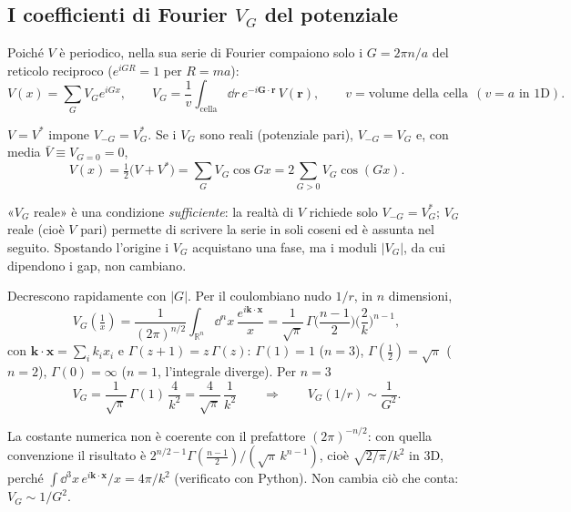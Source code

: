 \documentclass[11pt,a4paper]{article}
\begin{document}
\subsection{I coefficienti di Fourier $V_G$ del potenziale}
\begin{definizione}
Poiché $V$ è periodico, nella sua serie di Fourier compaiono solo i $G=2\pi n/a$ del reticolo reciproco ($e^{iGR}=1$ per $R=ma$):
\begin{equation}\label{eq:fourierV}
V(x)=\sum_GV_Ge^{iGx},\qquad V_G=\frac1v\int_{\text{cella}}\dd r\,e^{-i\mathbf G\cdot\mathbf r}\,V(\mathbf r),\qquad v=\text{volume della cella}\ \ (v=a\text{ in 1D}).
\end{equation}
\end{definizione}

$V=V^*$ impone $V_{-G}=V_G^*$. Se i $V_G$ sono reali (potenziale pari), $V_{-G}=V_G$ e, con media $\bar V\equiv V_{G=0}=0$,
\[
V(x)=\tfrac12\bigl(V+V^*\bigr)=\sum_GV_G\cos Gx=2\sum_{G>0}V_G\cos(Gx).
\]
\begin{osservazione}
«$V_G$ reale» è una condizione \emph{sufficiente}: la realtà di $V$ richiede solo $V_{-G}=V_G^*$; $V_G$ reale (cioè $V$ pari) permette di scrivere la serie in
soli coseni ed è assunta nel seguito. Spostando l'origine i $V_G$ acquistano una fase, ma i moduli $|V_G|$, da cui dipendono i gap, non cambiano.
\end{osservazione}

Decrescono rapidamente con $|G|$. Per il coulombiano nudo $1/r$, in $n$ dimensioni,
\[
V_G\!\left(\tfrac1x\right)=\frac1{(2\pi)^{n/2}}\int_{\mathbb R^n}\dd^nx\,\frac{e^{i\mathbf k\cdot\mathbf x}}{x}
=\frac1{\sqrt\pi}\,\Gamma\!\Big(\frac{n-1}2\Big)\Big(\frac2k\Big)^{n-1},
\]
con $\mathbf k\cdot\mathbf x=\sum_ik_ix_i$ e $\Gamma(z+1)=z\,\Gamma(z)$: $\Gamma(1)=1$ ($n=3$), $\Gamma(\frac12)=\sqrt\pi$ ($n=2$), $\Gamma(0)=\infty$ ($n=1$, l'integrale diverge). Per $n=3$
\[
V_G=\frac1{\sqrt\pi}\,\Gamma(1)\,\frac4{k^2}=\frac4{\sqrt\pi}\,\frac1{k^2}\qquad\Longrightarrow\qquad V_G(1/r)\sim\frac1{G^2}.
\]
\begin{osservazione}
La costante numerica non è coerente con il prefattore $(2\pi)^{-n/2}$: con quella convenzione il risultato è $2^{n/2-1}\Gamma(\frac{n-1}2)/(\sqrt\pi\,k^{n-1})$, cioè
$\sqrt{2/\pi}/k^2$ in 3D, perché $\int\dd^3x\,e^{i\mathbf k\cdot\mathbf x}/x=4\pi/k^2$ (verificato con Python). Non cambia ciò che conta: $V_G\sim1/G^2$.
\end{osservazione}
\end{document}
